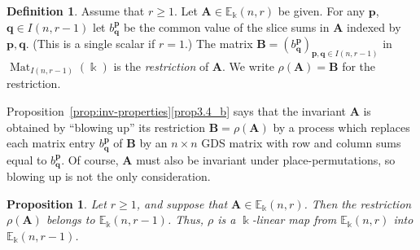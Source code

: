 \documentclass[10pt]{article}
\newtheorem{prop}[theorem]{Proposition}
\theoremstyle{definition}
\newtheorem{defi}[theorem]{Definition}
\DeclareMathOperator{\Mat}{Mat}
\newcommand{\E}{\mathbb{E}}
\newcommand{\bp}{{\boldsymbol{p}}}
\newcommand{\bq}{{\boldsymbol{q}}}
\newcommand{\bA}{\mathbf{A}}
\newcommand{\bB}{\mathbf{B}}
\begin{document}
\begin{defi}\label{def:restr}
 Assume that $r \ge 1$. Let $\bA \in \E_\Bbbk(n,r)$ be given. For
 any $\bp$, $\bq \in I(n,r-1)$ let $b^\bp_\bq$ be the common value of
 the slice sums in $\bA$ indexed by $\bp, \bq$. (This is a single
 scalar if $r=1$.) The matrix $\bB = (b^\bp_\bq)_{\bp,\bq \in
 I(n,r-1)}$ in $\Mat_{I(n,r-1)}(\Bbbk)$ is the \emph{restriction}
 of $\bA$. We write $\rho(\bA) = \bB$ for the restriction.
\end{defi}

Proposition~\ref{prop:inv-properties}\ref{prop3.4_b} says that the invariant
$\bA$ is obtained by ``blowing up'' its restriction $\bB = \rho(\bA)$
by a process which replaces each matrix entry $b^\bp_\bq$ of $\bB$ by
an $n \times n$ GDS matrix with row and column sums equal to
$b^\bp_\bq$. Of course, $\bA$ must also be invariant under
place-permutations, so blowing up is not the only consideration.

\begin{prop}\label{prop:restr-is-invariant}
 Let $r \ge 1$, and suppose that $\bA \in \E_\Bbbk(n,r)$. Then the
 restriction $\rho(\bA)$ belongs to $\E_\Bbbk(n,r-1)$. Thus, $\rho$
 is a $\Bbbk$-linear map from $\E_\Bbbk(n,r)$ into $\E_\Bbbk(n,r-1)$.
\end{prop}
\end{document}
